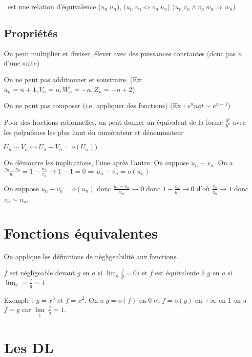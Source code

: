 \documentclass[french]{yLectureNote}
\newcommand{\Lim}[1]{\lim\limits_{\substack{#1}}\:}
\begin{document}
\begin{theorem}[Équivalent]
 $~$ est une relation d'équivalence ($u_n~u_n$), ($u_n~v_n \iff v_n~u_n$) ($u_n~v_n \wedge v_n~w_n \Rightarrow w_n$)
\end{theorem}
\subsection{Propriétés}
On peut multiplier et diviser, élever avec des puissances constantes (donc pas $n$ d'une suite)

On ne peut pas additionner et soustraire. (Ex: $u_n = n+1, V_n = n, W_n = -n, Z_n = -n+2$)

On ne peut pas composer (i.e. appliquer des fonctions) (Ex : $e^n not \sim e^{n+1}$)
\begin{proposition}
Pour des fractions rationnelles, on peut donner un équivalent de la forme $\frac{a^p}{b^n}$ avec les polyn\^omes les plus haut du numérateur et dénominateur
\end{proposition}

\begin{proposition}
\(U_n\sim V_n \iff U_n-V_n = o(U_n))\)
\end{proposition}
\begin{myproof}
On démontre les implications, l'une après l'autre.
On suppose $u_n\sim v_n$. On a $\frac{u_n-v_n}{u_n} = 1 -\frac{u_n}{v_n} \to 1-1 = 0 \Rightarrow u_n-v_n = o(u_n)$

On suppose $u_n-v_n = o(u_n)$ donc $\frac{u_n-v_n}{u_n} \to 0$ donc $1-\frac{v_n}{u_n} \to 0$ d'où $\frac{v_n}{u_n} \to 1 $ donc $v_n \sim u_n$.
\end{myproof}
\section{Fonctions équivalentes}
On applique les définitions de négligeabilité aux fonctions.
\begin{definition}
$f$ est négligeable devant $g$ en $a$ si \(\lim_{a} \frac{f}{g} = 0)\) et $f$ est équivalente à $g$ en $a$ si $\lim_{a} = \frac{f}{g} = 1$
\end{definition}
Exemple : $g = x^3$ et $f=x^2$. On a $g=o(f)$ en 0 et $f=o(g)$ en $+\infty$ en 1 on a $f\sim g$ car $\Lim{1} \frac{f}{g} = 1$.

\section{Les DL}
\end{document}
